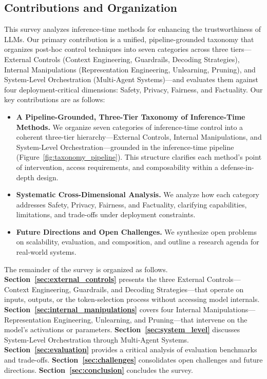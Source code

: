 \subsection{Contributions and Organization}
This survey analyzes inference-time methods for enhancing the trustworthiness of LLMs. Our primary contribution is a unified, pipeline-grounded taxonomy that organizes post-hoc control techniques into seven categories across three tiers---External Controls (Context Engineering, Guardrails, Decoding Strategies), Internal Manipulations (Representation Engineering, Unlearning, Pruning), and System-Level Orchestration (Multi-Agent Systems)---and evaluates them against four deployment-critical dimensions: Safety, Privacy, Fairness, and Factuality. Our key contributions are as follows:

\begin{itemize}
    \item \textbf{A Pipeline-Grounded, Three-Tier Taxonomy of Inference-Time Methods.} We organize seven categories of inference-time control into a coherent three-tier hierarchy---External Controls, Internal Manipulations, and System-Level Orchestration---grounded in the inference-time pipeline (Figure~\ref{fig:taxonomy_pipeline}). This structure clarifies each method's point of intervention, access requirements, and composability within a defense-in-depth design.
    \item \textbf{Systematic Cross-Dimensional Analysis.} We analyze how each category addresses Safety, Privacy, Fairness, and Factuality, clarifying capabilities, limitations, and trade-offs under deployment constraints.
    \item \textbf{Future Directions and Open Challenges.} We synthesize open problems on scalability, evaluation, and composition, and outline a research agenda for real-world systems.
\end{itemize}

The remainder of the survey is organized as follows. \textbf{Section~\ref{sec:external_controls}} presents the three External Controls---Context Engineering, Guardrails, and Decoding Strategies---that operate on inputs, outputs, or the token-selection process without accessing model internals. \textbf{Section~\ref{sec:internal_manipulations}} covers four Internal Manipulations---Representation Engineering, Unlearning, and Pruning---that intervene on the model's activations or parameters. \textbf{Section~\ref{sec:system_level}} discusses System-Level Orchestration through Multi-Agent Systems. \textbf{Section~\ref{sec:evaluation}} provides a critical analysis of evaluation benchmarks and trade-offs. \textbf{Section~\ref{sec:challenges}} consolidates open challenges and future directions. \textbf{Section~\ref{sec:conclusion}} concludes the survey.
